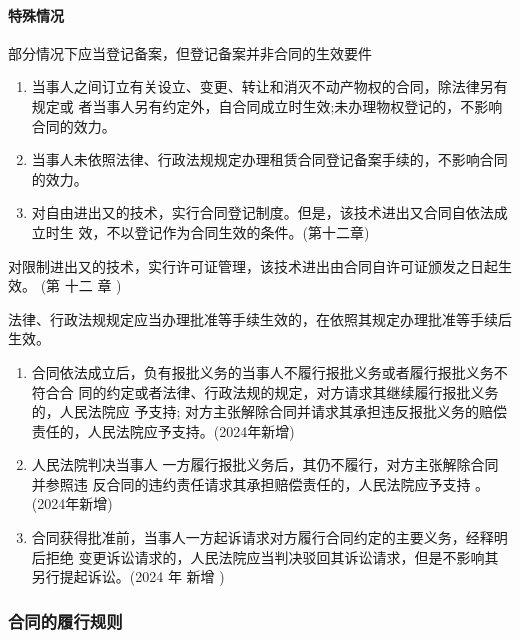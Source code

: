 \documentclass[UTF8,12pt]{ctexart}
\numberwithin{equation}{section} %
\numberwithin{figure}{section}
\numberwithin{table}{section}
\begin{document}
	\paragraph{特殊情况}
	部分情况下应当登记备案，但登记备案并非合同的生效要件 
	\begin{enumerate}
		\item 当事人之间订立有关设立、变更、转让和消灭不动产物权的合同，除法律另有规定或 者当事人另有约定外，自合同成立时生效;未办理物权登记的，不影响合同的效力。
		
		\item 当事人未依照法律、行政法规规定办理租赁合同登记备案手续的，不影响合同的效力。 
		
		\item 对自由进出又的技术，实行合同登记制度。但是，该技术进出又合同自依法成立时生 效，不以登记作为合同生效的条件。(第十二章)
		
	\end{enumerate}
	
	对限制进出又的技术，实行许可证管理，该技术进出由合同自许可证颁发之日起生效。 (第 十二 章 )
	
	法律、行政法规规定应当办理批准等手续生效的，在依照其规定办理批准等手续后生效。 
	\begin{enumerate}
		\item 合同依法成立后，负有报批义务的当事人不履行报批义务或者履行报批义务不符合合 同的约定或者法律、行政法规的规定，对方请求其继续履行报批义务的，人民法院应 予支持; 对方主张解除合同并请求其承担违反报批义务的赔偿责任的，人民法院应予支持。(2024年新增) 
		
		\item 人民法院判决当事人 一方履行报批义务后，其仍不履行，对方主张解除合同并参照违 反合同的违约责任请求其承担赔偿责任的，人民法院应予支持 。(2024年新增)
		
		\item 合同获得批准前，当事人一方起诉请求对方履行合同约定的主要义务，经释明后拒绝 变更诉讼请求的，人民法院应当判决驳回其诉讼请求，但是不影响其另行提起诉讼。(2024 年 新增 )
		
	\end{enumerate}
	
	\subsubsection{合同的履行规则}
\end{document}
